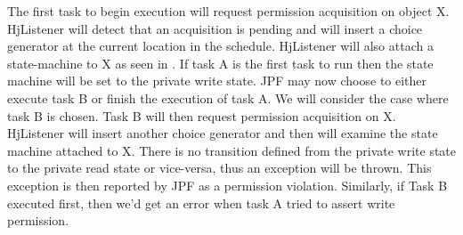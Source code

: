 The first task to begin execution will request permission acquisition on object
X. HjListener will detect that an acquisition is pending and will insert a
choice generator at the current location in the schedule. HjListener will also
attach a state-machine to X as seen in .
If task A is the first task to run then the state machine will be set to the
private write state. JPF may now choose to either execute task B or finish the
execution of task A. We will consider the case where task B is
chosen. Task B will then request permission acquisition on X.
HjListener will insert another choice generator and then will examine the state
machine attached to X. There is no transition defined from the private write
state to the private read state or vice-versa, thus an exception will be
thrown. This exception is then reported by JPF as a permission violation. Similarly, if Task B executed first, then we'd get an error when task A tried to assert write permission.
